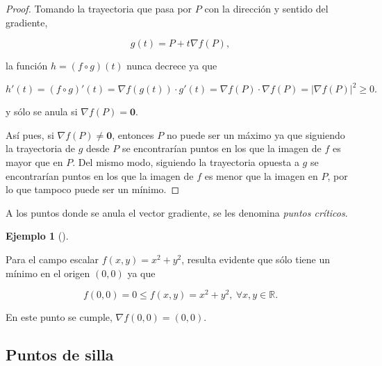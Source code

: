 \documentclass[
  a4paper,
]{scrreport}
\theoremstyle{definition}
\theoremstyle{plain}
\theoremstyle{plain}
\theoremstyle{definition}
\theoremstyle{definition}
\newtheorem{example}{Ejemplo}[chapter]
\theoremstyle{plain}
\theoremstyle{remark}
\begin{document}
\begin{tcolorbox}[enhanced jigsaw, breakable, title=\textcolor{quarto-callout-note-color}{\faInfo}\hspace{0.5em}{Demostración}, toprule=.15mm, coltitle=black, arc=.35mm, rightrule=.15mm, colframe=quarto-callout-note-color-frame, colbacktitle=quarto-callout-note-color!10!white, toptitle=1mm, titlerule=0mm, leftrule=.75mm, opacityback=0, colback=white, bottomrule=.15mm, bottomtitle=1mm, left=2mm, opacitybacktitle=0.6]

\begin{proof}

Tomando la trayectoria que pasa por \(P\) con la dirección y sentido del
gradiente,

\[
g(t)=P+t\nabla f(P),
\]

la función \(h=(f\circ g)(t)\) nunca decrece ya que

\[
h'(t)
= (f\circ g)'(t) 
= \nabla f(g(t))\cdot g'(t) 
= \nabla f(P)\cdot \nabla f(P) = 
|\nabla f(P)|^2\geq 0.
\]

y sólo se anula si \(\nabla f(P)= \mathbf{0}\).

Así pues, si \(\nabla f(P)\neq \mathbf{0}\), entonces \(P\) no puede ser
un máximo ya que siguiendo la trayectoria de \(g\) desde \(P\) se
encontrarían puntos en los que la imagen de \(f\) es mayor que en \(P\).
Del mismo modo, siguiendo la trayectoria opuesta a \(g\) se encontrarían
puntos en los que la imagen de \(f\) es menor que la imagen en \(P\),
por lo que tampoco puede ser un mínimo.

\end{proof}

\end{tcolorbox}

A los puntos donde se anula el vector gradiente, se les denomina
\emph{puntos críticos}.

\begin{example}[]\protect\hypertarget{exm-extremos-relativos}{}\label{exm-extremos-relativos}

Para el campo escalar \(f(x,y)=x^2+y^2\), resulta evidente que sólo
tiene un mínimo en el origen \((0,0)\) ya que

\[
f(0,0)=0 \leq f(x,y)=x^2+y^2,\ \forall x,y\in \mathbb{R}.
\]

En este punto se cumple, \(\nabla f(0,0) = (0,0)\).

\end{example}

\hypertarget{puntos-de-silla}{%
\subsection{Puntos de silla}\label{puntos-de-silla}}
\end{document}
